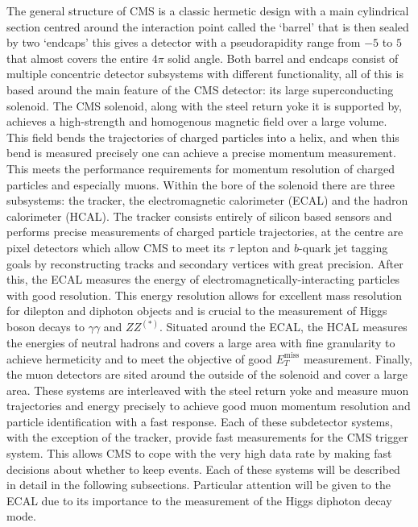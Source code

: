 The general structure of CMS is a classic hermetic design with a main cylindrical section centred around the interaction point called the `barrel' that is then sealed by two `endcaps' this gives a detector with a pseudorapidity range from $-5$ to $5$ that almost covers the entire $4\pi$ solid angle. Both barrel and endcaps consist of multiple concentric detector subsystems with different functionality, all of this is based around the main feature of the CMS detector: its large superconducting solenoid. 
The CMS solenoid, along with the steel return yoke it is supported by, achieves a high-strength and homogenous magnetic field over a large volume. This field bends the trajectories of charged particles into a helix, and when this bend is measured precisely one can achieve a precise momentum measurement. This meets the performance requirements for momentum resolution of charged particles and especially muons. Within the bore of the solenoid there are three subsystems: the tracker, the electromagnetic calorimeter (ECAL) and the hadron calorimeter (HCAL). The tracker consists entirely of silicon based sensors and performs precise measurements of charged particle trajectories, at the centre are pixel detectors which allow CMS to meet its $\tau$ lepton and $b$-quark jet tagging goals by reconstructing tracks and secondary vertices with great precision. 
After this, the ECAL measures the energy of electromagnetically-interacting particles with good resolution. This energy resolution allows for excellent mass resolution for dilepton and diphoton objects and is crucial to the measurement of Higgs boson decays to $\gamma\gamma$ and $ZZ^{(*)}$.
Situated around the ECAL, the HCAL measures the energies of neutral hadrons and covers a large area with fine granularity to achieve hermeticity and to meet the objective of good $E_{T}^{\mathrm{miss}}$ measurement.
Finally, the muon detectors are sited around the outside of the solenoid and cover a large area. These systems are interleaved with the steel return yoke and measure muon trajectories and energy precisely to achieve good muon momentum resolution and particle identification with a fast response. 
Each of these subdetector systems, with the exception of the tracker, provide fast measurements for the CMS trigger system. This allows CMS to cope with the very high data rate by making fast decisions about whether to keep events.
Each of these systems will be described in detail in the following subsections. Particular attention will be given to the ECAL due to its importance to the measurement of the Higgs diphoton decay mode. 


